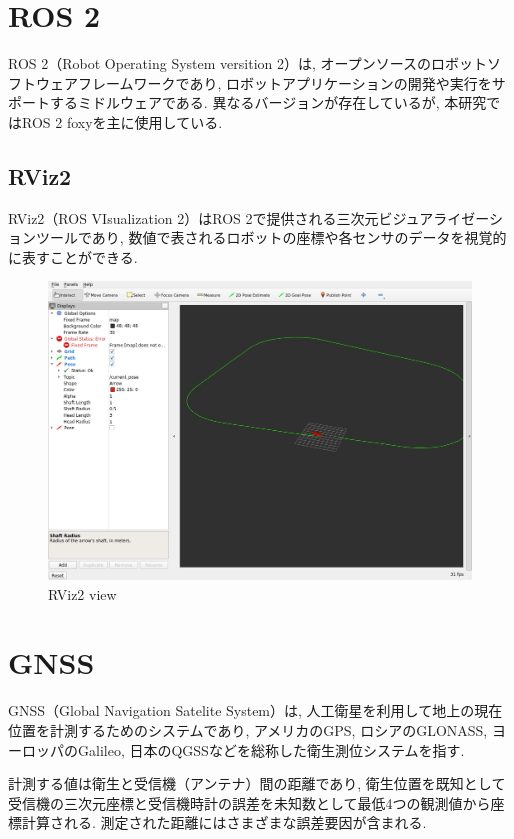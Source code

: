 
\section{ROS 2}
ROS 2（Robot Operating System versition 2）\cite{ros2}は, オープンソースのロボットソフトウェアフレームワークであり,
ロボットアプリケーションの開発や実行をサポートするミドルウェアである.
異なるバージョンが存在しているが, 本研究ではROS 2 foxyを主に使用している.

\subsection{RViz2}
RViz2（ROS VIsualization 2）\cite{rviz}はROS 2で提供される三次元ビジュアライゼーションツールであり, 
数値で表されるロボットの座標や各センサのデータを視覚的に表すことができる.

\begin{figure}[H]
  \centering
 \includegraphics[keepaspectratio, scale=0.4]
     {images/rviz.png}
 \caption{RViz2 view}
 \label{fig:purepursuit}
\end{figure}

\section{GNSS}
GNSS（Global Navigation Satelite System）は, 
人工衛星を利用して地上の現在位置を計測するためのシステムであり, 
アメリカのGPS, ロシアのGLONASS, ヨーロッパのGalileo, 日本のQGSSなどを総称した衛生測位システムを指す.

計測する値は衛生と受信機（アンテナ）間の距離であり, 衛生位置を既知として受信機の三次元座標と受信機時計の誤差を未知数として最低4つの観測値から座標計算される.
測定された距離にはさまざまな誤差要因が含まれる.

